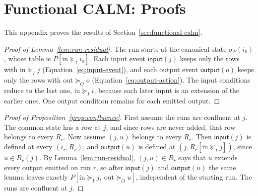 \documentclass[sigconf]{cidr-2027}
\theoremstyle{remark}
\newcommand{\InputGe}{\succeq_I}
\newcommand{\OutputGe}{\succeq_O}
\newcommand{\outrel}{extends\xspace}          %
\begin{document}
\section{Functional CALM: Proofs}
\label{app:proofs-sec2}

This appendix proves the results of Section~\ref{sec:functional-calm}.

\begin{proof}[Proof of Lemma~\ref{lem:run-residual}]
The run starts at the canonical state $\sigma_P(i_0)$, whose table is
$P[\mathrm{in}\InputGe i_0]$. Each input event $\mathsf{input}(j)$ keeps only
the rows with $\mathrm{in}\InputGe j$ (Equation~\ref{eq:input-event}), and each
output event $\mathsf{output}(o)$ keeps only the rows with
$\mathrm{out}\OutputGe o$ (Equation~\ref{eq:output-action}). The input
conditions reduce to the last one, $\mathrm{in}\InputGe i$, because each later
input is an extension of the earlier ones. One output condition remains for each
emitted output.
\end{proof}

\begin{proof}[Proof of Proposition~\ref{prop:confluence}]
\textcolor{reviewed}{First assume the runs are confluent at $j$.} The common state has a row at
$j$, and since rows are never added, that row belongs to every $R_r$. \textcolor{reviewed}{Now
assume $(j,u)$ belongs to every $R_r$.} Then $\mathsf{input}(j)$ is defined at
every $(i_r,R_r)$, and $\mathsf{output}(u)$ is defined at
$(j,R_r[\mathrm{in}\InputGe j])$, since $u\in R_r(j)$. By
Lemma~\ref{lem:run-residual}, $(j,u)\in R_r$ says that $u$ \outrel every output
emitted on run $r$, so after $\mathsf{input}(j)$ and $\mathsf{output}(u)$ the
same lemma leaves exactly
$P[\mathrm{in}\InputGe j,\ \mathrm{out}\OutputGe u]$, independent of the
starting run. The runs are confluent at $j$.
\end{proof}
\end{document}

